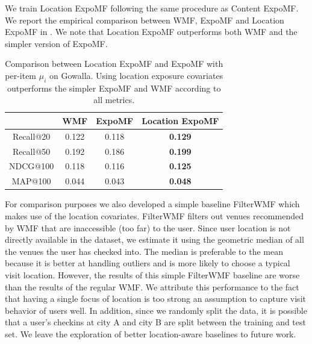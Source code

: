 
 We train Location ExpoMF following the same procedure as
Content ExpoMF. We report the empirical comparison between \gls{WMF}, ExpoMF and
Location ExpoMF in . We note that Location
ExpoMF outperforms both \gls{WMF} and the simpler version of ExpoMF. 

\begin{table}
\centering
\begin{tabular}{c c c c}
\toprule
            & WMF & ExpoMF & Location ExpoMF \\ \midrule
  Recall@20 & 0.122 & 0.118 & \textbf{0.129} \\
  Recall@50 & 0.192 & 0.186 & \textbf{0.199} \\
  NDCG@100  & 0.118 & 0.116 & \textbf{0.125} \\
  MAP@100   & 0.044 & 0.043 & \textbf{0.048} \\
\bottomrule
\end{tabular}
\caption{Comparison between Location ExpoMF and ExpoMF with per-item
$\mu_i$ on Gowalla. Using location exposure covariates outperforms the
simpler ExpoMF and \gls{WMF} according to all metrics.}
\label{chpt:expomf:tab:si_location_results}
\end{table}

For comparison purposes we also developed a simple baseline Filter\gls{WMF} which makes use of the
location covariates. Filter\gls{WMF} filters out venues recommended by \gls{WMF} that are inaccessible (too far) to the user. Since user
location is not directly available in the dataset, we estimate it using the
geometric median of all the venues the user has checked into. 
The median is preferable to the mean because it is better at handling outliers and is more likely to choose a typical visit location. 
However, the results of this simple Filter\gls{WMF} baseline are worse than the results of the
regular WMF. We attribute this performance to the fact that having a single focus of location 
is too strong an assumption to capture visit behavior of users well. 
In addition, since we randomly split the data, it is possible that a user's
checkins at city A and city B are split between the training and test set.
We leave the exploration of better location-aware baselines to future work. 



